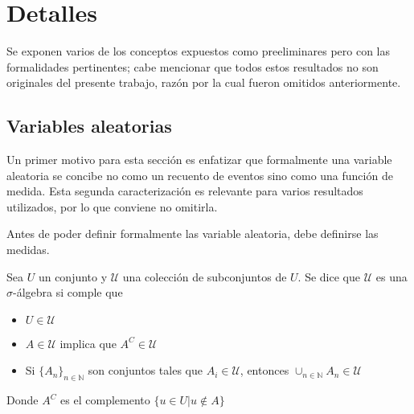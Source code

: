 \chapter{Detalles}

Se exponen varios de los conceptos expuestos como preeliminares pero con las formalidades
pertinentes; cabe mencionar que todos estos resultados no son originales del presente trabajo,
razón por la cual fueron omitidos anteriormente.


\section{Variables aleatorias}

Un primer motivo para esta sección es enfatizar que formalmente una variable aleatoria se concibe 
no como un recuento de eventos sino como una función de medida. Esta segunda 
caracterización es relevante para varios resultados utilizados, por lo que
conviene no omitirla.

Antes de poder definir formalmente las variable aleatoria, debe definirse las medidas.

\begin{defn}
Sea $U$ un conjunto y $\mathcal{U}$ una colección de subconjuntos de $U$. Se dice que $\mathcal{U}$
es una $\sigma$-álgebra si comple que
\begin{itemize}
\item $U \in \mathcal{U}$
\item $A \in \mathcal{U}$ implica que $A^{C} \in \mathcal{U}$
\item Si $\{ A_n \}_{n\in \mathbb{N}}$ son conjuntos tales que $A_i \in \mathcal{U}$, entonces
$\displaystyle \cup_{n\in \mathbb{N}} A_n \in \mathcal{U}$
\end{itemize}
Donde $A^{C}$ es el complemento $\{ u \in U | u \notin A \} $
\end{defn}

